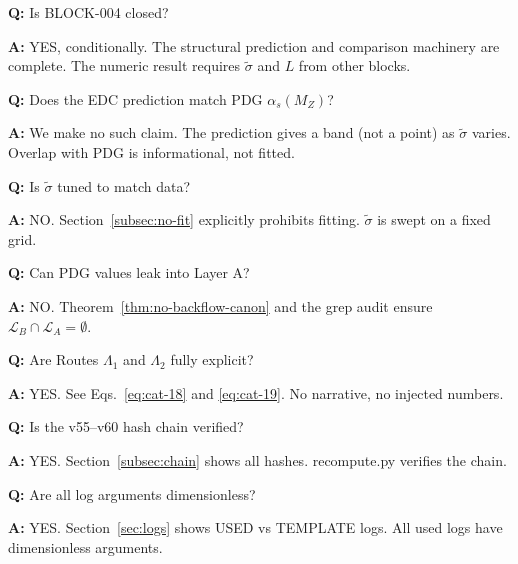 \documentclass[11pt,a4paper]{article}
\theoremstyle{definition}
\begin{document}
\begin{trapbox}
\textbf{Q:} Is BLOCK-004 closed?

\textbf{A:} YES, conditionally. The structural prediction and comparison machinery
are complete. The numeric result requires $\tilde{\sigma}$ and $L$ from other blocks.
\end{trapbox}

\begin{trapbox}
\textbf{Q:} Does the EDC prediction match PDG $\alpha_s(M_Z)$?

\textbf{A:} We make no such claim. The prediction gives a band (not a point)
as $\tilde{\sigma}$ varies. Overlap with PDG is informational, not fitted.
\end{trapbox}

\begin{trapbox}
\textbf{Q:} Is $\tilde{\sigma}$ tuned to match data?

\textbf{A:} NO. Section~\ref{subsec:no-fit} explicitly prohibits fitting.
$\tilde{\sigma}$ is swept on a fixed grid.
\end{trapbox}

\begin{trapbox}
\textbf{Q:} Can PDG values leak into Layer A?

\textbf{A:} NO. Theorem~\ref{thm:no-backflow-canon} and the grep audit ensure
$\mathcal{L}_B \cap \mathcal{L}_A = \emptyset$.
\end{trapbox}

\begin{trapbox}
\textbf{Q:} Are Routes $\Lambda_1$ and $\Lambda_2$ fully explicit?

\textbf{A:} YES. See Eqs.~\eqref{eq:cat-18} and \eqref{eq:cat-19}.
No narrative, no injected numbers.
\end{trapbox}

\begin{trapbox}
\textbf{Q:} Is the v55--v60 hash chain verified?

\textbf{A:} YES. Section~\ref{subsec:chain} shows all hashes.
recompute.py verifies the chain.
\end{trapbox}

\begin{trapbox}
\textbf{Q:} Are all log arguments dimensionless?

\textbf{A:} YES. Section~\ref{sec:logs} shows USED vs TEMPLATE logs.
All used logs have dimensionless arguments.
\end{trapbox}
\end{document}
